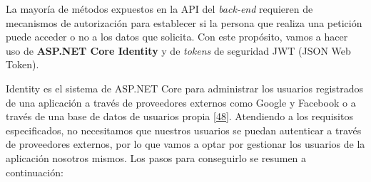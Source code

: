 \documentclass[11pt,spanish,listoffigures]{tfgetsinf}
\begin{document}
La mayoría de métodos expuestos en la API del \textit{back-end} requieren de mecanismos de autorización para establecer si la persona que realiza una petición puede acceder o no a los datos que solicita. Con este propósito, vamos a hacer uso de \textbf{ASP.NET Core Identity} y de \textit{tokens} de seguridad JWT (JSON Web Token). 

Identity es el sistema de ASP.NET Core para administrar los usuarios registrados de una aplicación a través de proveedores externos como Google y Facebook o a través de una base de datos de usuarios propia \hyperlink{page.80}{[48]}. Atendiendo a los requisitos especificados, no necesitamos que nuestros usuarios se puedan autenticar a través de proveedores externos, por lo que vamos a optar por gestionar los usuarios de la aplicación nosotros mismos. Los pasos para conseguirlo se resumen a continuación:
\end{document}
